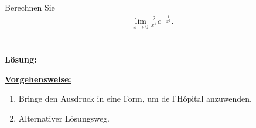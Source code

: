 \newpage

\subsection*{}
Berechnen Sie 
\begin{align*}
\lim \limits_{x \to 0} \frac{2}{x^4} e^{- \frac{1}{x^2}}.
\end{align*}
\\
\\
\textbf{Lösung:}
\begin{mdframed}
	\underline{\textbf{Vorgehensweise:}}
	\begin{enumerate}
		\item Bringe den Ausdruck in eine Form, um de l'H\^{o}pital anzuwenden.
		\item Alternativer Lösungsweg.
	\end{enumerate}
\end{mdframed}

